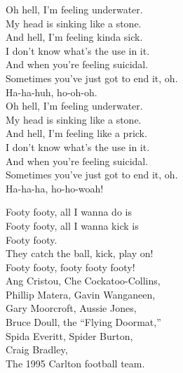 


Oh hell, I'm feeling underwater. \\
My head is sinking like a stone. \\
And hell, I'm feeling kinda sick. \\
I don't know what's the use in it. \\
And when you're feeling suicidal. \\
Sometimes you've just got to end it, oh. \\

Ha-ha-huh, ho-oh-oh. \\

Oh hell, I'm feeling underwater. \\
My head is sinking like a stone. \\
And hell, I'm feeling like a prick. \\
I don't know what's the use in it. \\
And when you're feeling suicidal. \\
Sometimes you've just got to end it, oh. \\

Ha-ha-ha, ho-ho-woah! \\




Footy footy, all I wanna do is \\
Footy footy, all I wanna kick is \\
Footy footy. \\
They catch the ball, kick, play on! \\
Footy footy, footy footy footy! \\

Ang Cristou, Che Cockatoo-Collins, \\
Phillip Matera, Gavin Wanganeen, \\
Gary Moorcroft, Aussie Jones, \\
Bruce Doull, the ``Flying Doormat,'' \\
Spida Everitt, Spider Burton, \\
Craig Bradley, \\
The 1995 Carlton football team. \\


